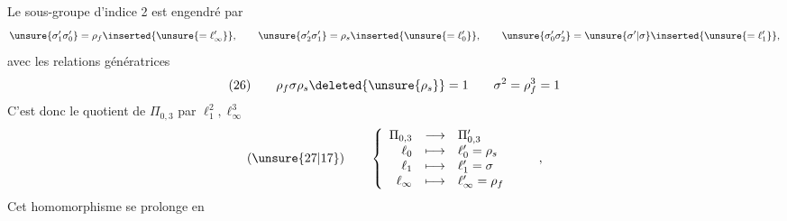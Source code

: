 Le sous-groupe  d'indice 2  est engendré par
\[
\unsure{\sigma_1'\sigma_0'}=\rho_f\inserted{\unsure{=\ell_\infty'}},\qquad
\unsure{\sigma_2'\sigma_1'}=\rho_s\inserted{\unsure{=\ell_0'}},\qquad
\unsure{\sigma_0'\sigma_2'}=\unsure{\sigma'|\sigma}\inserted{\unsure{=\ell_1'}},
\]
avec les relations génératrices
\[
(26)\qquad
\rho_f\sigma\rho_s\deleted{\unsure{\rho_s}}=1
\qquad
\sigma^2=\rho_f^3=1
\]
C'est donc le quotient de $\Pi_{0,3}$ par $\ell_1^2,\ell_\infty^3$
\[
(\unsure{27|17})\qquad
\left\{\begin{array}{rcl}
\Pi_{0,3}&\longrightarrow&\Pi_{0,3}'\\
\ell_0&\longmapsto&\ell_0'=\rho_s\\
\ell_1&\longmapsto&\ell_1'=\sigma\\
\ell_\infty&\longmapsto&\ell_\infty'=\rho_f
\end{array}\right.
\qquad,
\]
 Cet homomorphisme se prolonge en


